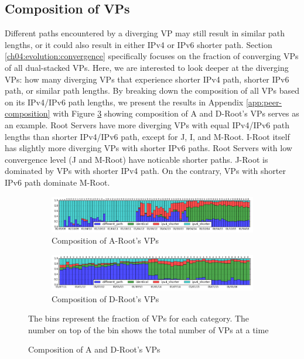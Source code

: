 \subsection{Composition of VPs}
\label{ch04:diff:composition}

Different paths encountered by a diverging VP may still result in similar path lengths, or it could also result in either IPv4 or IPv6 shorter path. Section \ref{ch04:evolution:convergence} specifically focuses  on the fraction of converging VPs of all dual-stacked VPs. Here, we are interested to look deeper at the diverging VPs: how many diverging VPs that experience shorter IPv4 path, shorter IPv6 path, or similar path lengths. By breaking down the composition of all VPs based on its IPv4/IPv6 path lengths, we present the results in Appendix \ref{app:peer-composition} with Figure \ref{fig:ch04:composition} showing composition of A and D-Root's VPs serves as an example. Root Servers have more diverging VPs with equal IPv4/IPv6 path lengths than shorter IPv4/IPv6 path, except for J, I, and M-Root. I-Root itself has slightly more diverging VPs with shorter IPv6 paths. Root Servers with low convergence level (J and M-Root) have noticable shorter paths. J-Root is dominated by VPs with shorter IPv4 path. On the contrary, VPs with shorter IPv6 path dominate M-Root.
 

\begin{figure}[!ht]
	\begin{subfigure}{1\textwidth}
		\centering
		\includegraphics[width=6in]{img/peer_composition_a.png}
		\caption{Composition of A-Root's VPs}
		\label{fig:ch04:composition_a}
	\end{subfigure}
	\begin{subfigure}{1\textwidth}
		\centering
		\includegraphics[width=6in]{img/peer_composition_d.png}
		\caption{Composition of D-Root's VPs}
		\label{fig:ch04:composition_d}
	\end{subfigure}	
	{\scriptsize The bins represent the fraction of VPs for each category. The number on top of the bin shows the total number of VPs at a time}
	\caption{Composition of A and D-Root's VPs}
	\label{fig:ch04:composition}
\end{figure}


